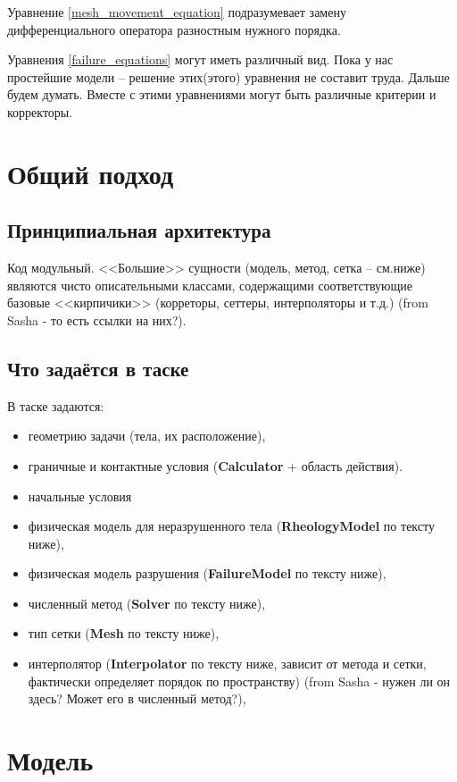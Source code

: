 \documentclass[a4paper,12pt]{article}
\numberwithin{equation}{section}
\begin{document}
	Уравнение \eqref{mesh_movement_equation} подразумевает замену дифференциального оператора разностным нужного порядка.
	
	Уравнения \eqref{failure_equations} могут иметь различный вид. Пока у нас простейшие модели -- решение этих(этого) уравнения не составит труда. Дальше будем думать.
	Вместе с этими уравнениями могут быть различные критерии и корректоры.
	

\section{Общий подход}

\subsection{Принципиальная архитектура}

Код модульный. <<Большие>> сущности (модель, метод, сетка -- см.ниже) являются чисто описательными классами, содержащими соответствующие базовые <<кирпичики>> (корреторы, сеттеры, интерполяторы и т.д.) (from Sasha - то есть ссылки на них?).

\subsection{Что задаётся в таске}

В таске задаются:
	\begin{itemize}
		\item{геометрию задачи (тела, их расположение),}
		\item{граничные и контактные условия (\textbf{Calculator} + область действия).}
		\item{начальные условия}
		\item{физическая модель для неразрушенного тела (\textbf{RheologyModel} по тексту ниже),}
		\item{физическая модель разрушения (\textbf{FailureModel} по тексту ниже),}
		\item{численный метод (\textbf{Solver} по тексту ниже),}
		\item{тип сетки (\textbf{Mesh} по тексту ниже),}
		\item{интерполятор (\textbf{Interpolator} по тексту ниже, зависит от метода и сетки, фактически определяет порядок по пространству) (from Sasha - нужен ли он здесь? Может его в численный метод?),}
	\end{itemize}

\section{Модель}
\end{document}

